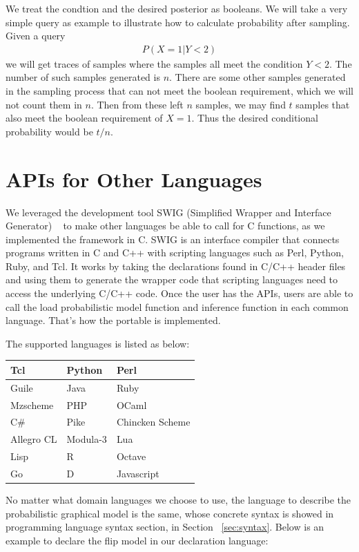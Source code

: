 We treat the condtion and the desired posterior as booleans. We will take a very simple query as example to illustrate how to calculate probability after sampling. Given a query
\begin{align*}
  P (X = 1| Y < 2)
\end{align*}
we will get traces of samples where the samples all meet the condition $Y < 2$. The number of such samples generated is $n$. There are some other samples generated in the sampling process that can not meet the boolean requirement, which we will not count them in $n$. Then from these left $n$ samples, we may find $t$ samples that also meet the boolean requirement of $X = 1$. Thus the desired conditional probability would be $t / n$.

\section{APIs for Other Languages}
\label{sec:api}
We leveraged the development tool SWIG (Simplified Wrapper and Interface Generator) ~\cite{swig} to make other languages be able to call for C functions, as we implemented the framework in C. SWIG is an interface compiler that connects programs written in C and C++ with scripting languages such as Perl, Python, Ruby, and Tcl. It works by taking the declarations found in C/C++ header files and using them to generate the wrapper code that scripting languages need to access the underlying C/C++ code. Once the user has the APIs, users are able to call the load probabilistic model function and inference function in each common language. That's how the portable is implemented. 

The supported languages is listed as below:

\begin{center}
\begin{tabular}{|l|l|l|}
\hline
Tcl & Python & Perl \\
\hline
Guile & Java & Ruby \\
\hline
Mzscheme & PHP & OCaml \\
\hline
C\# & Pike & Chincken Scheme \\
\hline
Allegro CL & Modula-3 & Lua \\
\hline
Lisp & R & Octave \\
\hline
Go & D & Javascript \\
\hline
\end{tabular}
\end{center}

No matter what domain languages we choose to use, the language to describe the probabilistic graphical model is the same, whose concrete syntax is showed in programming language syntax section, in Section ~\ref{sec:syntax}. Below is an example to declare the flip model in our declaration language:

